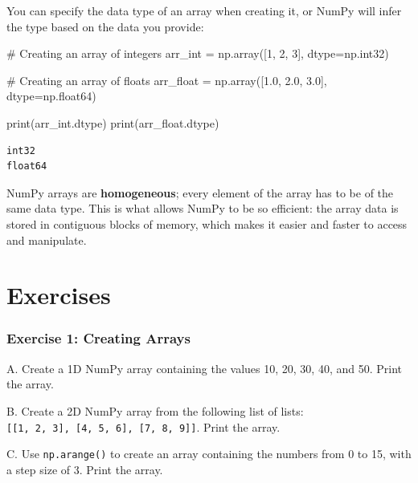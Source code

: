 \documentclass[
  letterpaper,
  DIV=11,
  numbers=noendperiod]{scrreprt}
\newenvironment{Shaded}{\begin{snugshade}}{\end{snugshade}}
\newcommand{\BuiltInTok}[1]{\textcolor[rgb]{0.00,0.23,0.31}{#1}}
\newcommand{\CommentTok}[1]{\textcolor[rgb]{0.37,0.37,0.37}{#1}}
\newcommand{\DecValTok}[1]{\textcolor[rgb]{0.68,0.00,0.00}{#1}}
\newcommand{\FloatTok}[1]{\textcolor[rgb]{0.68,0.00,0.00}{#1}}
\newcommand{\NormalTok}[1]{\textcolor[rgb]{0.00,0.23,0.31}{#1}}
\newcommand{\OperatorTok}[1]{\textcolor[rgb]{0.37,0.37,0.37}{#1}}
\begin{document}
You can specify the data type of an array when creating it, or NumPy
will infer the type based on the data you provide:

\begin{Shaded}
\begin{Highlighting}[]
\CommentTok{\# Creating an array of integers}
\NormalTok{arr\_int }\OperatorTok{=}\NormalTok{ np.array([}\DecValTok{1}\NormalTok{, }\DecValTok{2}\NormalTok{, }\DecValTok{3}\NormalTok{], dtype}\OperatorTok{=}\NormalTok{np.int32)}

\CommentTok{\# Creating an array of floats}
\NormalTok{arr\_float }\OperatorTok{=}\NormalTok{ np.array([}\FloatTok{1.0}\NormalTok{, }\FloatTok{2.0}\NormalTok{, }\FloatTok{3.0}\NormalTok{], dtype}\OperatorTok{=}\NormalTok{np.float64)}

\BuiltInTok{print}\NormalTok{(arr\_int.dtype)  }
\BuiltInTok{print}\NormalTok{(arr\_float.dtype)  }
\end{Highlighting}
\end{Shaded}

\begin{verbatim}
int32
float64
\end{verbatim}

NumPy arrays are \textbf{homogeneous}; every element of the array has to
be of the same data type. This is what allows NumPy to be so efficient:
the array data is stored in contiguous blocks of memory, which makes it
easier and faster to access and manipulate.

\hypertarget{exercises-9}{%
\section{Exercises}\label{exercises-9}}

\hypertarget{exercise-1-creating-arrays}{%
\subsubsection{Exercise 1: Creating
Arrays}\label{exercise-1-creating-arrays}}

A. Create a 1D NumPy array containing the values 10, 20, 30, 40, and 50.
Print the array.

B. Create a 2D NumPy array from the following list of lists:
\texttt{{[}{[}1,\ 2,\ 3{]},\ {[}4,\ 5,\ 6{]},\ {[}7,\ 8,\ 9{]}{]}}.
Print the array.

C. Use \texttt{np.arange()} to create an array containing the numbers
from 0 to 15, with a step size of 3. Print the array.
\end{document}
